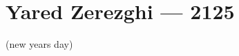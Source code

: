 \hypertarget{yared-zerezghi-2125}{%
\chapter{Yared Zerezghi — 2125}\label{yared-zerezghi-2125}}

(new years day)
